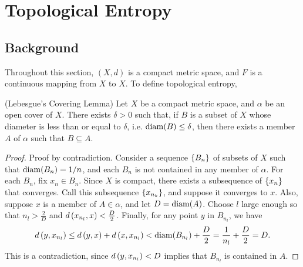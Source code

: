\documentclass[12pt,twoside,draft]{book}
\begin{document}
\chapter{Topological Entropy}

\section{Background}
Throughout this section, $(X,d)$ is a compact metric space,  and $F$ is a continuous mapping from $X$ to $X$.
To define topological entropy, 

\begin{lemma}
  (Lebesgue's Covering Lemma)
  Let $X$ be a compact metric space, and $\alpha$ be an open cover of $X$.
  There exists $\delta > 0$ such that, if $B$ is a subset of $X$ whose diameter is less than or equal to $\delta$, i.e. $\mathrm{diam}(B) \leq \delta$, then there exists a member $A$ of $\alpha$ such that $B \subseteq A$.
  \label{lem:covering}

  \begin{proof}
    Proof by contradiction.
    Consider a sequence $\left \{ B_n \right \}$ of subsets of $X$ such that $\mathrm{diam}(B_n) = 1/n$, and each $B_n$ is not contained in any member of $\alpha$.
    For each $B_n$, fix $x_n \in B_n$.
    Since $X$ is compact, there exists a subsequence of $\left \{ x_n \right \}$ that converges.
    Call this subsequence $\left \{ x_{n_k} \right \}$, and suppose it converges to $x$.
    Also, suppose $x$ is a member of $A \in \alpha$, and let $D = \mathrm{diam}(A)$.
    Choose $l$ large enough so that $n_l > \frac{2}{D}$ and $d\left( x_{n_l}, x \right) < \frac{D}{2}$.
    Finally, for any point $y$ in $B_{n_l}$, we have
    \begin{equation*}
      d\left( y, x_{n_l} \right)
      \leq d\left( y,x \right) + d\left( x, x_{n_l} \right)
      < \mathrm{diam}(B_{n_l})  + \frac{D}{2}
      = \frac{1}{n_l} + \frac{D}{2}
      = D.
    \end{equation*}
    This is a contradiction, since $d\left( y, x_{n_l} \right) < D$ implies that $B_{n_l}$ is contained in $A$.
  \end{proof}
\end{lemma}
\end{document}

